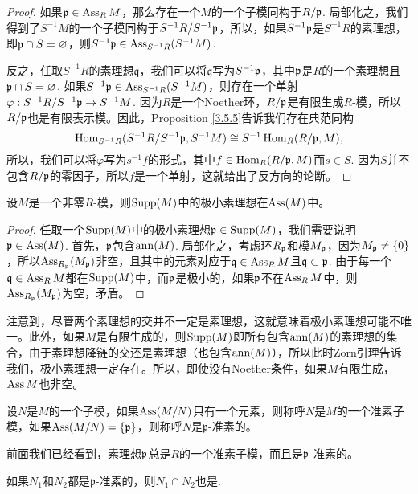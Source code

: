 \begin{proof}
如果$\mathfrak{p}\in \operatorname{Ass}_R M$，那么存在一个$M$的一个子模同构于$R/\mathfrak{p}$. 局部化之，我们得到了$S^{-1}M$的一个子模同构于$S^{-1}R/S^{-1}\mathfrak{p}$，所以，如果$S^{-1}\mathfrak{p}$是$S^{-1}R$的素理想，即$\mathfrak{p}\cap S= \varnothing$，则$S^{-1}\mathfrak{p}\in\operatorname{Ass}_{S^{-1}R}(S^{-1}M)$.

反之，任取$S^{-1}R$的素理想$\mathfrak{q}$，我们可以将$\mathfrak{q}$写为$S^{-1}\mathfrak{p}$，其中$\mathfrak{p}$是$R$的一个素理想且$\mathfrak{p}\cap S=\varnothing$. 如果$S^{-1}\mathfrak{p}\in \operatorname{Ass}_{S^{-1}R}(S^{-1}M)$，则存在一个单射$\varphi:S^{-1}R/S^{-1}\mathfrak{p}\to S^{-1}M$. 因为$R$是一个Noether环，$R/\mathfrak{p}$是有限生成$R$-模，所以$R/\mathfrak{p}$也是有限表示模。因此，Proposition \ref{3.5.5}告诉我们存在典范同构
\[
	\operatorname{Hom}_{S^{-1}R}(S^{-1}R/S^{-1}\mathfrak{p},S^{-1}M)\cong S^{-1}\operatorname{Hom}_R(R/\mathfrak{p},M),
\]
所以，我们可以将$\varphi$写为$s^{-1}f$的形式，其中$f\in \operatorname{Hom}_R(R/\mathfrak{p},M)$而$s\in S$. 因为$S$并不包含$R/\mathfrak{p}$的零因子，所以$f$是一个单射，这就给出了反方向的论断。
\end{proof}

\begin{pro}\label{pro:5.1.9}
设$M$是一个非零$R$-模，则$\operatorname{Supp}(M)$中的极小素理想在$\operatorname{Ass} (M)$中。
\end{pro}

\begin{proof}
任取一个$\operatorname{Supp}(M)$中的极小素理想$\mathfrak{p}\in \operatorname{Supp}(M)$，我们需要说明$\mathfrak{p}\in \operatorname{Ass}(M)$. 首先，$\mathfrak{p}$包含$\operatorname{ann}(M)$. 局部化之，考虑环$R_{\mathfrak{p}}$和模$M_{\mathfrak{p}}$，因为$M_{\mathfrak{p}}\neq \{0\}$，所以$\operatorname{Ass}_{R_{\mathfrak{p}}}(M_{\mathfrak{p}})$非空，且其中的元素对应于$\mathfrak{q}\in \operatorname{Ass}_R M$且$\mathfrak{q}\subset \mathfrak{p}$. 由于每一个$\mathfrak{q}\in \operatorname{Ass}_R M$都在$\operatorname{Supp}(M)$中，而$\mathfrak{p}$是极小的，如果$\mathfrak{p}$不在$\operatorname{Ass}_R M$中，则$\operatorname{Ass}_{R_{\mathfrak{p}}}(M_{\mathfrak{p}})$为空，矛盾。
\end{proof}

注意到，尽管两个素理想的交并不一定是素理想，这就意味着极小素理想可能不唯一。此外，如果$M$是有限生成的，则$\operatorname{Supp}(M)$即所有包含$\operatorname{ann}(M)$的素理想的集合，由于素理想降链的交还是素理想（也包含$\operatorname{ann}(M)$），所以此时Zorn引理告诉我们，极小素理想一定存在。所以，即使没有Noether条件，如果$M$有限生成，$\operatorname{Ass} M$也非空。

\begin{para}
设$N$是$M$的一个子模，如果$\operatorname{Ass}(M/N)$只有一个元素，则称呼$N$是$M$的一个准素子模，如果$\operatorname{Ass}(M/N)=\{\mathfrak{p}\}$，则称呼$N$是$\mathfrak{p}$-准素的。
\end{para}

前面我们已经看到，素理想$\mathfrak{p}$总是$R$的一个准素子模，而且是$\mathfrak{p}$-准素的。

\begin{lem}
	如果$N_1$和$N_2$都是$\mathfrak{p}$-准素的，则$N_1\cap N_2$也是. 
\end{lem}

